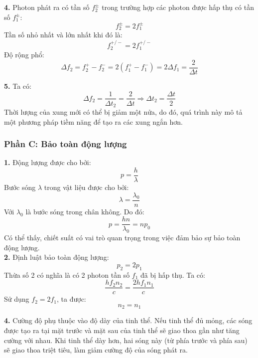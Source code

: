 \noindent\textbf{4.} Photon phát ra có tần số $f_2^{\pm}$ trong trường hợp các photon được hấp thụ có tần số $f_1^{\pm}$:
\begin{equation*}
  f_2^{\pm} = 2 f_1^{\pm}
\end{equation*}
Tần số nhỏ nhất và lớn nhất khi đó là:
\begin{equation*}
  f_2^{+/ -} = 2 f_1^{+/ -}
\end{equation*}
Độ rộng phổ:
\begin{equation*}
  \Delta f_2 = f_2^+ - f_2^- = 2(f_1^+ - f_1^-) = 2 \Delta f_1 = \frac{2}{\Delta t}
\end{equation*}

\noindent\textbf{5.} Ta có:
\begin{equation*}
  \Delta f_2 = \frac{1}{\Delta t_2} = \frac{2}{\Delta t} \Rightarrow \Delta t_2 = \frac{\Delta t}{2}
\end{equation*}
Thời lượng của xung mới có thể bị giảm một nửa, do đó, quá trình này mô tả một phương pháp tiềm năng để tạo ra các xung ngắn hơn.\\

\subsubsection*{Phần C: Bảo toàn động lượng}
\noindent\textbf{1.} Động lượng được cho bởi:
\begin{equation*}
  p = \frac{h}{\lambda}
\end{equation*}
Bước sóng $\lambda$ trong vật liệu được cho bởi:
\begin{equation*}
  \lambda = \frac{\lambda_0}{n}
\end{equation*}
Với $\lambda_0$ là bước sóng trong chân không. Do đó:
\begin{equation*}
  p = \frac{hn}{\lambda_0} = n p_0
\end{equation*}
Có thể thấy, chiết suất có vai trò quan trọng trong việc đảm bảo sự bảo toàn động lượng.\\

\noindent\textbf{2.} Định luật bảo toàn động lượng:
\begin{equation*}
  p_2 = 2p_1
\end{equation*}
Thừa số 2 có nghĩa là có 2 photon tần số $f_1$ đã bị hấp thụ. Ta có:
\begin{equation*}
  \frac{hf_2 n_2}{c} = \frac{2 h f_1 n_1}{c}
\end{equation*}
Sử dụng $f_2 = 2f_1$, ta được:
\begin{equation*}
  n_2 = n_1
\end{equation*}

\noindent\textbf{4.} Cường độ phụ thuộc vào độ dày của tinh thể. Nếu tinh thể đủ mỏng, các sóng được tạo ra tại mặt trước và mặt sau của tinh thể sẽ giao thoa gần như tăng cường với nhau. Khi tinh thể dày hơn, hai sóng này (từ phía trước và phía sau) sẽ giao thoa triệt tiêu, làm giảm cường độ của sóng phát ra.\\
